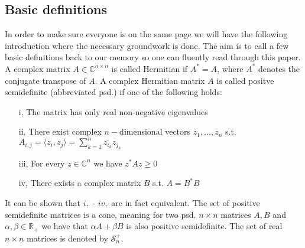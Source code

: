 \subsection{Basic definitions}
In order to make sure everyone is on the same page we will have the following introduction where the necessary groundwork is done. The aim is to call a few basic definitions back to our memory so one can fluently read through this paper. \\
A complex matrix $A \in \mathbb{C}^{n \times n}$ is called Hermitian if $A^*=A$, where $A^*$ denotes the conjugate transpose of $A$. A complex Hermitian matrix $A$ is called positve semidefinite (abbreviated psd.) if one of the following holds: 
\begin{enumerate}
\item[i,] The matrix has only real non-negative eigenvalues 
\item[ii,] There exist complex $n-$dimensional vectors $z_1, \dots, z_n$ s.t. $A_{i,j} = \langle z_i, z_j \rangle = \sum_{k=1}^n \overline{z_{i_k}}z_{j_k}$
\item[iii,] For every $z \in \mathbb{C}^n$ we have $z^*Az\ge 0$
\item[iv,] There exists a complex matrix $B$ s.t. $A=B^*B$
\end{enumerate}
It can be shown that $i,$ - $iv,$ are in fact equivalent. The set of positive semidefinite matrices is a cone, meaning for two psd. $n \times n$ matrices $A,B$ and $\alpha, \beta \in \mathbb{R}_+$ we have that $\alpha A + \beta B $ is also positive semidefinite. The set of real $n \times n$ matrices is denoted by $\mathcal{S}_n^+$.\\
